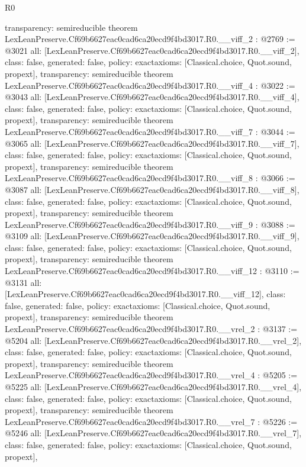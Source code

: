 \begin{lexlean}{R0}
\begin{coremodule}
{  transparency: semireducible
}
theorem LexLeanPreserve.Cf69b6627eac0cad6ca20ecd9f4bd3017.R0.__viff_2 : @2769 := @3021 {
  all: [LexLeanPreserve.Cf69b6627eac0cad6ca20ecd9f4bd3017.R0.__viff_2],
  class: false,
  generated: false,
  policy: exact{axioms: [Classical.choice, Quot.sound, propext]},
  transparency: semireducible
}
theorem LexLeanPreserve.Cf69b6627eac0cad6ca20ecd9f4bd3017.R0.__viff_4 : @3022 := @3043 {
  all: [LexLeanPreserve.Cf69b6627eac0cad6ca20ecd9f4bd3017.R0.__viff_4],
  class: false,
  generated: false,
  policy: exact{axioms: [Classical.choice, Quot.sound, propext]},
  transparency: semireducible
}
theorem LexLeanPreserve.Cf69b6627eac0cad6ca20ecd9f4bd3017.R0.__viff_7 : @3044 := @3065 {
  all: [LexLeanPreserve.Cf69b6627eac0cad6ca20ecd9f4bd3017.R0.__viff_7],
  class: false,
  generated: false,
  policy: exact{axioms: [Classical.choice, Quot.sound, propext]},
  transparency: semireducible
}
theorem LexLeanPreserve.Cf69b6627eac0cad6ca20ecd9f4bd3017.R0.__viff_8 : @3066 := @3087 {
  all: [LexLeanPreserve.Cf69b6627eac0cad6ca20ecd9f4bd3017.R0.__viff_8],
  class: false,
  generated: false,
  policy: exact{axioms: [Classical.choice, Quot.sound, propext]},
  transparency: semireducible
}
theorem LexLeanPreserve.Cf69b6627eac0cad6ca20ecd9f4bd3017.R0.__viff_9 : @3088 := @3109 {
  all: [LexLeanPreserve.Cf69b6627eac0cad6ca20ecd9f4bd3017.R0.__viff_9],
  class: false,
  generated: false,
  policy: exact{axioms: [Classical.choice, Quot.sound, propext]},
  transparency: semireducible
}
theorem LexLeanPreserve.Cf69b6627eac0cad6ca20ecd9f4bd3017.R0.__viff_12 : @3110 := @3131 {
  all: [LexLeanPreserve.Cf69b6627eac0cad6ca20ecd9f4bd3017.R0.__viff_12],
  class: false,
  generated: false,
  policy: exact{axioms: [Classical.choice, Quot.sound, propext]},
  transparency: semireducible
}
theorem LexLeanPreserve.Cf69b6627eac0cad6ca20ecd9f4bd3017.R0.__vrel_2 : @3137 := @5204 {
  all: [LexLeanPreserve.Cf69b6627eac0cad6ca20ecd9f4bd3017.R0.__vrel_2],
  class: false,
  generated: false,
  policy: exact{axioms: [Classical.choice, Quot.sound, propext]},
  transparency: semireducible
}
theorem LexLeanPreserve.Cf69b6627eac0cad6ca20ecd9f4bd3017.R0.__vrel_4 : @5205 := @5225 {
  all: [LexLeanPreserve.Cf69b6627eac0cad6ca20ecd9f4bd3017.R0.__vrel_4],
  class: false,
  generated: false,
  policy: exact{axioms: [Classical.choice, Quot.sound, propext]},
  transparency: semireducible
}
theorem LexLeanPreserve.Cf69b6627eac0cad6ca20ecd9f4bd3017.R0.__vrel_7 : @5226 := @5246 {
  all: [LexLeanPreserve.Cf69b6627eac0cad6ca20ecd9f4bd3017.R0.__vrel_7],
  class: false,
  generated: false,
  policy: exact{axioms: [Classical.choice, Quot.sound, propext]},
}
\end{coremodule}
\end{lexlean}
